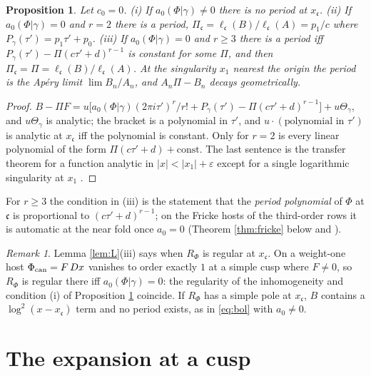 \documentclass[11pt]{amsart}
\newtheorem{proposition}[theorem]{Proposition}
\theoremstyle{definition}
\theoremstyle{remark}
\newtheorem{remark}[theorem]{Remark}
\newcommand{\ct}{a_0}\renewcommand{\Re}{\operatorname{Re}}\renewcommand{\Im}{\operatorname{Im}}
\newcommand{\cc}{\mathfrak c}\newcommand{\Pc}{\Pi_{\cc}}\newcommand{\Pq}{\Pi^{q}}
\begin{document}
\begin{proposition}\label{prop:exist}
Let $c_0=0$. (i) If $\ct(\Phi|\gamma)\ne0$ there is no period at $x_{\cc}$. (ii) If $\ct(\Phi|\gamma)=0$ and $r=2$ there is a period, $\Pc=\ell_{\cc}(B)/\ell_{\cc}(A)=p_1/c$ where $P_\gamma(\tau')=p_1\tau'+p_0$. (iii) If $\ct(\Phi|\gamma)=0$ and $r\ge3$ there is a period iff $P_\gamma(\tau')-\Pi(c\tau'+d)^{r-1}$ is constant for some $\Pi$, and then $\Pc=\Pi=\ell_{\cc}(B)/\ell_{\cc}(A)$. At the singularity $x_1$ nearest the origin the period is the Ap\'ery limit $\lim B_n/A_n$, and $A_n\Pi-B_n$ decays geometrically.
\end{proposition}
\begin{proof}
$B-\Pi F=u\bigl[\ct(\Phi|\gamma)(2\pi i\tau')^r/r!+P_\gamma(\tau')-\Pi(c\tau'+d)^{r-1}\bigr]+u\Theta_\gamma$, and $u\Theta_\gamma$ is analytic; the bracket is a polynomial in $\tau'$, and $u\cdot(\text{polynomial in }\tau')$ is analytic at $x_{\cc}$ iff the polynomial is constant. Only for $r=2$ is every linear polynomial of the form $\Pi(c\tau'+d)+\text{const}$. The last sentence is the transfer theorem for a function analytic in $|x|<|x_1|+\varepsilon$ except for a single logarithmic singularity at $x_1$ \cite{FS}.
\end{proof}

For $r\ge3$ the condition in (iii) is the statement that the \emph{period polynomial} of $\Phi$ at $\cc$ is proportional to $(c\tau'+d)^{r-1}$; on the Fricke hosts of the third-order rows it is automatic at the near fold once $\ct=0$ (Theorem \ref{thm:fricke} below and \cite[Thm.~B]{ProjSources}).

\begin{remark}
Lemma \ref{lem:L}(iii) says when $R_\Phi$ is regular at $x_{\cc}$. On a weight-one host $\Phi_{\rm can}=F\,Dx$ vanishes to order exactly $1$ at a simple cusp where $F\ne0$, so $R_\Phi$ is regular there iff $\ct(\Phi|\gamma)=0$: the regularity of the inhomogeneity and condition (i) of Proposition \ref{prop:exist} coincide. If $R_\Phi$ has a simple pole at $x_{\cc}$, $B$ contains a $\log^2(x-x_{\cc})$ term and no period exists, as in \eqref{eq:bol} with $\ct\ne0$.
\end{remark}

\section{The expansion at a cusp}\label{sec:expansion}
\end{document}
